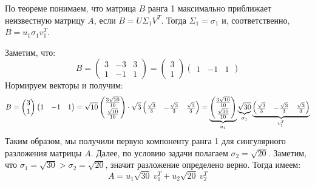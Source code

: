 По теореме понимаем, что матрица $B$ ранга 1 максимально приближает неизвестную матрицу $A$, если $B = U \Sigma_1 V^T$. Тогда $\Sigma_1 = \sigma_1$ и, соответственно, $B = u_1 \sigma_1 v_1^T$.

Заметим, что:
\[
    B =
    \begin{pmatrix}
        3 & -3 & 3 \\
        1 & -1 & 1
    \end{pmatrix}
    =
    \begin{pmatrix}
        3 \\
        1
    \end{pmatrix}
    \begin{pmatrix}
        1 & -1 & 1
    \end{pmatrix}
\]
Нормируем векторы и получим:
\[
    B =
    \begin{pmatrix}
        3 \\
        1
    \end{pmatrix}
    \begin{pmatrix}
        1 & -1 & 1
    \end{pmatrix}
    =
    \sqrt{10}
    \begin{pmatrix}
        \frac{3 \sqrt{10}}{10} \\[0.7mm]
        \frac{\sqrt{10}}{10}
    \end{pmatrix}
    \cdot
    \sqrt{3}
    \begin{pmatrix}
        \frac{\sqrt{3}}{3} & -\frac{\sqrt{3}}{3} & \frac{\sqrt{3}}{3}
    \end{pmatrix}
    =
    \underbrace{
        \begin{pmatrix}
            \frac{3 \sqrt{10}}{10} \\[0.7mm]
            \frac{\sqrt{10}}{10}
        \end{pmatrix}
    }_{u_1}
    \underbrace{\sqrt{30}}_{\sigma_1}
    \underbrace{
        \begin{pmatrix}
            \frac{\sqrt{3}}{3} & -\frac{\sqrt{3}}{3} & \frac{\sqrt{3}}{3}
        \end{pmatrix}
    }_{v_1^T}
\]
Таким образом, мы получили первую компоненту ранга 1 для сингулярного разложения матрицы $A$. Далее, по условию задачи полагаем $\sigma_2 = \sqrt{20}$. Заметим, что $\sigma_1 = \sqrt{30} > \sigma_2 = \sqrt{20}$, значит разложение определено верно. Тогда имеем:
\[
    A = u_1 \sqrt{30}\  v_1^T + u_2 \sqrt{20}\  v_2^T
\]

